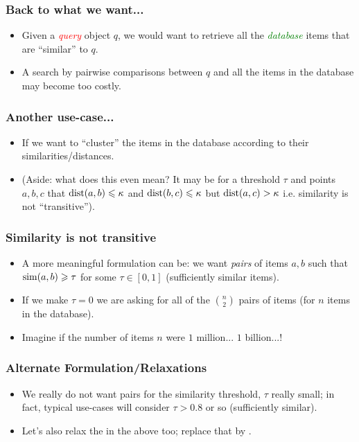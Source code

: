 \documentclass{beamer}
\begin{document}
\begin{frame}
\frametitle{Back to what we want...}
\begin{itemize}
\item Given a \textcolor{red}{\em query} object $q$, we would want to retrieve all the \textcolor{green}{\em database} items that are ``similar'' to $q$.
\pause
\item A search by pairwise comparisons between $q$ and all the items in the database may become too costly.
\end{itemize}
\end{frame}


\begin{frame}
\frametitle{Another use-case...}
\begin{itemize}
\item If we want to ``cluster'' the items in the database according to their similarities/distances. 
\pause 
\item (Aside: what does this even mean? It may be for a threshold $\tau$ and points $a, b, c$ that $\mathrm{dist}(a, b) \leqslant \kappa$ and $\mathrm{dist}(b, c) \leqslant \kappa$ but $\mathrm{dist}(a, c) > \kappa$ i.e. similarity is not ``transitive'').
\end{itemize}
\end{frame}

\begin{frame}
\frametitle{Similarity is not transitive}
\begin{itemize}
\item A more meaningful formulation can be: we want  {\em pairs} of items $a, b$ such that $\mathrm{sim}(a, b)\geqslant \tau$ for some $\tau \in [0, 1]$ (sufficiently similar items).
\pause
\item If we make $\tau = 0$ we are asking for all of the $\binom{n}{2}$ pairs of items (for $n$ items in the database).
\pause
\item Imagine if the number of items $n$ were \pause $1$ million... \pause $1$ billion...!
\end{itemize}
\end{frame}

\begin{frame}
\frametitle{Alternate Formulation/Relaxations}
\begin{itemize}
\item We really do not want  pairs for the similarity threshold, $\tau$ really small; in fact, typical use-cases will consider $\tau > 0.8$ or so (sufficiently similar).
\item Let's also relax the  in the above too; replace that by .
\end{itemize}
\end{frame}
\end{document}
